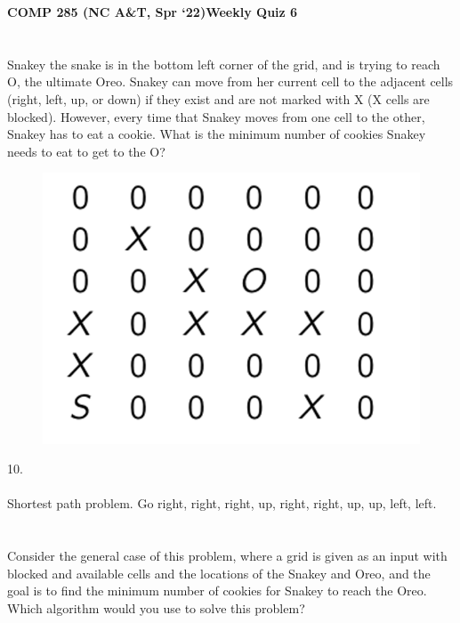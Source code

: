 \documentclass [12pt]{article}
\begin{document}
 

{\LARGE \textbf {COMP 285 (NC A\&T, Spr `22)}\hfill \textbf {Weekly Quiz 6} } 

\section{} Snakey the snake is in the bottom left corner of the grid, and is trying to reach O, the ultimate Oreo. 
Snakey can move from her current cell to the adjacent cells (right, left, up, or down) if they exist and are not marked with X (X cells are blocked). However, every time that Snakey moves from one cell to the other, Snakey has to eat a cookie. What is the minimum number of cookies Snakey needs to eat to get to the O? 

\begin{figure}[H]
    \centering
    \includegraphics[scale=0.5]{6.png} 
    \label{fig:my_label}
\end{figure}

\begin{Solution}
10.
\paragraph{}
Shortest path problem. Go right, right, right, up, right, right, up, up, left, left.
\end{Solution}


\section{} Consider the general case of this problem, where a grid is given as an input with blocked and available cells and the locations of the Snakey and Oreo, and the goal is to find the minimum number of cookies for Snakey to reach the Oreo. Which algorithm would you use to solve this problem?
\end{document}
